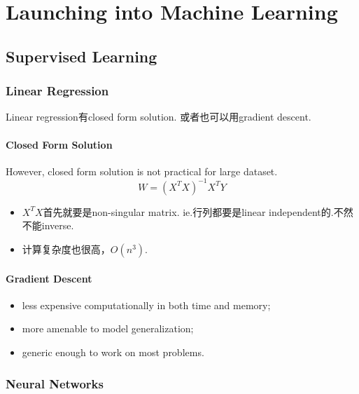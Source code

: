 \chapter{Launching into Machine Learning}
\section{Supervised Learning}
\subsection{Linear Regression}
Linear regression有closed form solution. 或者也可以用gradient descent.

\subsubsection{Closed Form Solution}
However, closed form solution is not practical for large dataset.
\[ W=(X^T X)^{-1} X^T Y \]
\begin{itemize}
	\item $ X^T X $首先就要是non-singular matrix. ie.行列都要是linear independent的.不然不能inverse.
	\item 计算复杂度也很高，$ O(n^3) $.
\end{itemize}

\subsubsection{Gradient Descent}
\begin{itemize}
	\item less expensive computationally in both time and memory;
	\item more amenable to model generalization;
	\item generic enough to work on most problems.
\end{itemize}

\subsection{Neural Networks}

